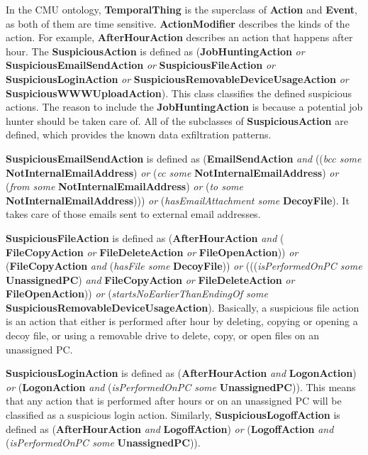 In the CMU ontology, \textbf{TemporalThing} is the superclass of \textbf{Action} and 
\textbf{Event}, as both of them are time sensitive. 
\textbf{ActionModifier} describes the kinds of the action. 
For example, \textbf{AfterHourAction} describes an action that happens after hour. 
The \textbf{SuspiciousAction} is defined as (\textbf{JobHuntingAction} \textit{or} \textbf{SuspiciousEmailSendAction} \textit{or} \textbf{SuspiciousFileAction} \textit{or} \textbf{SuspiciousLoginAction} \textit{or} \textbf{SuspiciousRemovableDeviceUsageAction} \textit{or} \textbf{SuspiciousWWWUploadAction}). 
This class classifies the defined suspicious actions. 
The reason to include the \textbf{JobHuntingAction} is because a potential job hunter should be taken care of. 
All of the subclasses of \textbf{SuspiciousAction} are defined, which provides the known data exfiltration patterns. 

\textbf{SuspiciousEmailSendAction} is defined as (\textbf{EmailSendAction} \textit{and} ((\textit{bcc some} \textbf{NotInternalEmailAddress}) \textit{or} (\textit{cc some} \textbf{NotInternalEmailAddress}) \textit{or} (\textit{from some} \textbf{NotInternalEmailAddress}) \textit{or} (\textit{to some} \textbf{NotInternalEmailAddress}))) \textit{or} (\textit{hasEmailAttachment some} \textbf{DecoyFile}).
It takes care of those emails sent to external email addresses. 

\textbf{SuspiciousFileAction} is defined as (\textbf{AfterHourAction} \textit{and} ( \textbf{FileCopyAction} \textit{or} \textbf{FileDeleteAction} \textit{or} \textbf{FileOpenAction})) \textit{or} (\textbf{FileCopyAction} \textit{and} (\textit{hasFile some} \textbf{DecoyFile})) \textit{or} (((\textit{isPerformedOnPC some} \textbf{UnassignedPC}) \textit{and} \textbf{FileCopyAction} \textit{or} \textbf{FileDeleteAction} \textit{or}  \textbf{FileOpenAction})) \textit{or} (\textit{startsNoEarlierThanEndingOf some} \textbf{SuspiciousRemovableDeviceUsageAction}). 
Basically, a suspicious file action is an action that either is performed after hour by deleting, copying or opening a decoy file, or using a removable drive to delete, copy, or open files on an unassigned PC. 

\textbf{SuspiciousLoginAction} is defined as (\textbf{AfterHourAction} \textit{and} \textbf{LogonAction}) \textit{or} (\textbf{LogonAction} \textit{and} (\textit{isPerformedOnPC some} \textbf{UnassignedPC})).
This means that any action that is performed after hours or on an unassigned PC will be classified as a suspicious login action. 
Similarly, \textbf{SuspiciousLogoffAction} is defined as (\textbf{AfterHourAction} \textit{and} \textbf{LogoffAction}) \textit{or} (\textbf{LogoffAction} \textit{and} (\textit{isPerformedOnPC some} \textbf{UnassignedPC})).

